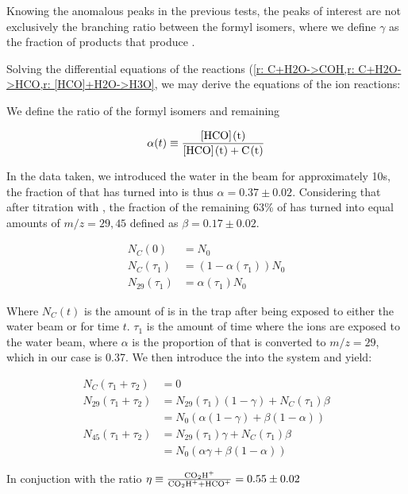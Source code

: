 Knowing the anomalous peaks in the previous tests, the peaks of interest are not exclusively the branching ratio between the formyl isomers, where we define $\gamma$ as the fraction of products that produce .

Solving the differential equations of the  reactions (\cref{r: C+H2O->COH,r: C+H2O->HCO,r: [HCO]+H2O->H3O}, we may derive the equations of the ion reactions:

We define the ratio of the formyl isomers and remaining 

\begin{equation}
	\alpha(t) \equiv \frac{\ce{[HCO](t)}}{\ce{[HCO](t) + C(t)}}
\end{equation}

In the data taken, we introduced the water in the beam for approximately 10s, the fraction of  that has turned into \ce{[HCO]+} is thus $\alpha = 0.37 \pm 0.02$. Considering that after titration with , the fraction of the remaining 63\% of  has turned into equal amounts of $m/z=29, 45$ defined as $\beta = 0.17 \pm 0.02$.

\begin{align}
	N_C(0) & = N_0 \\
	N_C(\tau_1) & = (1-\alpha(\tau_1))N_0 \\
	N_{29}(\tau_1) & = \alpha(\tau_1) N_0
\end{align}

Where $N_C(t)$ is the amount of  is in the trap after being exposed to either the water beam or  for time $t$. $\tau_1$ is the amount of time where the ions are exposed to the water beam, where $\alpha$ is the proportion of  that is converted to $m/z=29$, which in our case is 0.37. We then introduce the  into the system and yield:

\begin{align}
	N_C(\tau_1 + \tau_2) & = 0 \\
	N_{29}(\tau_1 + \tau_2) & = N_{29}(\tau_1)(1-\gamma) + N_C(\tau_1)\beta \\
	& = N_0(\alpha(1-\gamma)+\beta(1-\alpha)) \\
	N_{45}(\tau_1 + \tau_2) & = N_{29}(\tau_1)\gamma + N_C(\tau_1)\beta \\
	& = N_0(\alpha \gamma+\beta(1-\alpha))
\end{align}

In conjuction with the ratio $\eta \equiv \frac{\ce{CO2H+}}{\ce{CO2H+} + \ce{HCO+}} = 0.55 \pm 0.02$

